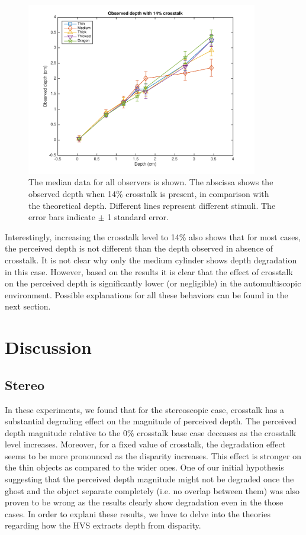 \begin{figure}[H]
\centering
    \includegraphics[width=0.9\textwidth]{./Template_Figures/a_crosstalk_14}
    \caption{The median data for all observers is shown. The abscissa shows the observed depth when 14\% crosstalk is present, in comparison with the theoretical depth. Different lines represent different stimuli. The error bars indicate $\pm$ 1 standard error.\label{fig:a_crosstalk_14}}
\end{figure}
Interestingly, increasing the crosstalk level to 14\% also shows that for most cases, the perceived depth is not different than the depth observed in absence of crosstalk. It is not clear why only the medium cylinder shows depth degradation in this case. However, based on the results it is clear that the effect of crosstalk on the perceived depth is significantly lower (or negligible) in the automultiscopic environment. Possible explanations for all these behaviors can be found in the next section.

\section {Discussion}
\subsection{Stereo}
In these experiments, we found that for the stereoscopic case, crosstalk has a substantial degrading effect on the magnitude of perceived depth. The perceived depth magnitude relative to the 0\% crosstalk base case deceases as the crosstalk level increases. Moreover, for a fixed value of crosstalk, the degradation effect seems to be more pronounced as the disparity increases. This effect is stronger on the thin objects as compared to the wider ones. One of our initial hypothesis suggesting that the perceived depth magnitude might not be degraded once the ghost and the object separate completely (i.e. no overlap between them) was also proven to be wrong as the results clearly show degradation even in the those cases. In order to explani these results, we have to delve into the theories regarding how the HVS extracts depth from disparity.

